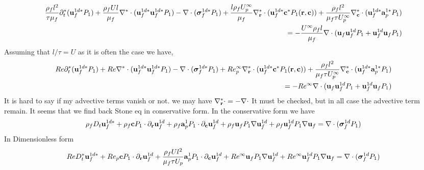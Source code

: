 \documentclass[11pt]{My_preprint}
\begin{document}
\begin{align*}
    \frac{\rho_f l^2 }{\tau \mu_f}\partial_t^*( \textbf{u}_f^{1d*}  P_1)
    + \frac{\rho_f U l}{\mu_f }\mathbf{\nabla}^* \cdot (\textbf{u}_f^{1d*} \textbf{u}_f^{1d*}  P_1) 
    -  \mathbf{\nabla}\cdot (\bm\sigma_f^{1d*} P_1)
    + \frac{l \rho_f U^\infty_p}{\mu_f } \mathbf{\nabla}_\textbf{r}^* \cdot (  \textbf{u}_f^{1d*} \textbf{c}^*  P_1(\textbf{r},\textbf{c}) )
    +  \frac{\rho_f l^2}{\mu_f \tau U^\infty_p} \mathbf{\nabla}_\textbf{c}^* \cdot (  \textbf{u}_f^{1d*} \textbf{a}_p^{1*}  P_1 )\\
    = 
    -  \frac{U^\infty\rho_f l}{\mu_f } \mathbf{\nabla}\cdot ( \textbf{u}_f \textbf{u}_f^{1d}  P_1
        +  \textbf{u}_f^{1d} \textbf{u}_f  P_1)
\end{align*}
Assuming that $l/\tau = U$ as it is often the case we have, 
\begin{align*}
    Re \partial_t^*( \textbf{u}_f^{1d*}  P_1)
    + Re \mathbf{\nabla}^* \cdot (\textbf{u}_f^{1d*} \textbf{u}_f^{1d*}  P_1) 
    -  \mathbf{\nabla}\cdot (\bm\sigma_f^{1d*} P_1)
    + Re_p^\infty \mathbf{\nabla}_\textbf{r}^* \cdot (  \textbf{u}_f^{1d*} \textbf{c}^*  P_1(\textbf{r},\textbf{c}) )
    +  \frac{\rho_f l^2}{\mu_f \tau U^\infty_p} \mathbf{\nabla}_\textbf{c}^* \cdot (  \textbf{u}_f^{1d*} \textbf{a}_p^{1*}  P_1 )\\
    = 
    - Re^\infty \mathbf{\nabla}\cdot ( \textbf{u}_f \textbf{u}_f^{1d}  P_1
        +  \textbf{u}_f^{1d} \textbf{u}_f  P_1)
\end{align*}
It is hard to say if my advective terms vanish or not. 
we may have $\mathbf{\nabla}_\textbf{r}^* \cdot = - \mathbf{\nabla}\cdot$ 
It must be checked, but in all case the advective term remain. 
It seems that we find back Stone eq in conservative form. 
In the conservative form we have 
\begin{align*}
    \rho_f D_t  \textbf{u}_f^{1d*}  
    +  \rho_f  \textbf{c}  P_1   \cdot {\partial_\textbf{r}} \textbf{u}_f^{1d} 
    +  \rho_f  \textbf{a}_p^1  P_1   \cdot \partial_\textbf{c} \textbf{u}_f^{1d} 
    + \rho_f \textbf{u}_f  P_1 \mathbf{\nabla} \textbf{u}_f^{1d}
    +  \rho_f \textbf{u}_f^{1d} P_1 \mathbf{\nabla}\textbf{u}_f
    = 
    \mathbf{\nabla}\cdot ( \bm\sigma_f^{1d} P_1)
\end{align*}
In Dimensionless form 
\begin{align*}
    Re D_t^*  \textbf{u}_f^{1d*}  
    + Re_p  \textbf{c}  P_1   \cdot {\partial_\textbf{r}} \textbf{u}_f^{1d} 
    +  \frac{\rho_f U l^2 }{\mu_f \tau U_p}  \textbf{a}_p^1  P_1   \cdot \partial_\textbf{c} \textbf{u}_f^{1d} 
    + Re^\infty \textbf{u}_f  P_1 \mathbf{\nabla} \textbf{u}_f^{1d}
    + Re^\infty \textbf{u}_f^{1d} P_1 \mathbf{\nabla}\textbf{u}_f
    = 
    \mathbf{\nabla}\cdot ( \bm\sigma_f^{1d} P_1)
\end{align*}
\end{document}
